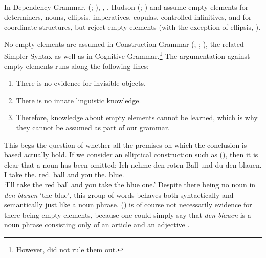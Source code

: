 In Dependency Grammar, \mel (\citeyear[, 303]{Melcuk88a-u}; \citeyear[]{Melcuk2003a-u}),
\citet[]{Starosta88a-u}, \citet[--472]{Eroms2000a}, Hudson (\citeyear[Section~3.7]{Hudson2007a-u}; \citeyear[]{Hudson2010b-u}) and
\citet{Engel2014a} assume empty elements for determiners, nouns, ellipsis, imperatives, copulas, controlled infinitives, and for coordinate
structures, but \citet[]{GO2009a} reject empty elements (with the exception of ellipsis, \citealp{Osborne2016a-u}).

No empty elements are assumed in Construction Grammar\indexcxg\label{Seite-leere-Elemente-CxG} (\citealp[--50]{MR2001a}; \citealp[]{Goldberg2003b}; \citealp[]{Goldberg2006a}), the related Simpler Syntax \citep{CJ2005a} as well as in Cognitive Grammar.\footnote{%
  However, \citet[]{Fillmore88a} did not rule them out.
} 
The argumentation against empty elements runs along the following lines:
\begin{enumerate}
\item There is no evidence for invisible objects.
\item There is no innate linguistic knowledge.
\item Therefore, knowledge about empty elements cannot be learned, which is why they cannot be assumed
as part of our grammar.
\end{enumerate}
This begs the question of whether all the premises on which the conclusion is based actually hold. If we consider an elliptical
construction such as (), then it is clear that a noun has been omitted:
\ea
\gll Ich nehme den roten Ball und du den blauen.\\
	 I take the.\acc{} red.\acc{} ball and you the.\acc{} blue.\acc{}\\
\glt `I'll take the red ball and you take the blue one.'
\z
Despite there being no noun in \emph{den blauen} `the blue', this group of words behaves both syntactically and semantically just like a noun
phrase. () is of course not necessarily evidence for there being empty elements, because one could simply say that \emph{den blauen}
is a noun phrase consisting only of an article and an adjective \citep{Wunderlich87d}. 

